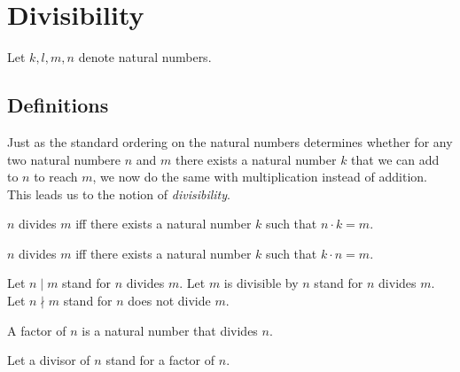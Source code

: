 \documentclass[../../arithmetic.tex]{subfiles}
\begin{document}
  \section{Divisibility}

  \begin{forthel}
  \end{forthel}

  \begin{forthel}
  \end{forthel}

  \begin{forthel}
  \end{forthel}

  \begin{forthel}
    Let $k, l, m, n$ denote natural numbers.
  \end{forthel}


  \subsection{Definitions}

  Just as the standard ordering on the natural numbers determines whether for
  any two natural numbere $n$ and $m$ there exists a natural number $k$ that we
  can add to $n$ to reach $m$, we now do the same with multiplication instead of
  addition. This leads us to the notion of \textit{divisibility}.

  \begin{forthel}
    \begin{definition}
      $n$ divides $m$ iff there exists a natural number $k$ such that $n \cdot k = m$.
    \end{definition}

    \begin{lemma}\label{Arithmetic_03_01_926592}
      $n$ divides $m$ iff there exists a natural number $k$ such that $k \cdot n = m$.
    \end{lemma}

    Let $n \mid m$ stand for $n$ divides $m$.
    Let $m$ is divisible by $n$ stand for $n$ divides $m$.
    Let $n \nmid m$ stand for $n$ does not divide $m$.

    \begin{definition}
      A factor of $n$ is a natural number that divides $n$.
    \end{definition}

    Let a divisor of $n$ stand for a factor of $n$.
  \end{forthel}
\end{document}
